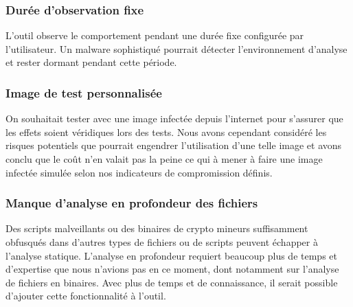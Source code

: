 \subsubsection{Durée d'observation fixe}
 L'outil observe le comportement pendant une durée fixe configurée par l'utilisateur. Un malware sophistiqué pourrait détecter l'environnement d'analyse et rester dormant pendant cette période.

\subsubsection{Image de test personnalisée}
On souhaitait tester avec une image infectée depuis l'internet pour s'assurer que les effets soient véridiques lors des tests. Nous avons cependant considéré les risques potentiels que pourrait engendrer l'utilisation d'une telle image et avons conclu que le coût n'en valait pas la peine ce qui à mener à faire une image infectée simulée selon nos indicateurs de compromission définis.

\subsubsection{Manque d'analyse en profondeur des fichiers}
Des scripts malveillants ou des binaires de crypto mineurs suffisamment obfusqués dans d'autres types de fichiers ou de scripts peuvent échapper à l'analyse statique. L'analyse en profondeur requiert beaucoup plus de temps et d'expertise que nous n'avions pas en ce moment, dont notamment sur l'analyse de fichiers en binaires. Avec plus de temps et de connaissance, il serait possible d'ajouter cette fonctionnalité à l'outil.
\newpage
